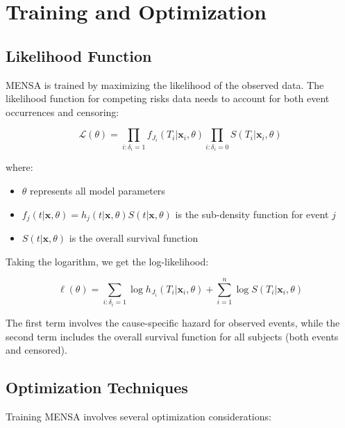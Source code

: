 \section{Training and Optimization}

\subsection{Likelihood Function}

MENSA is trained by maximizing the likelihood of the observed data. The likelihood function for competing risks data needs to account for both event occurrences and censoring:

\begin{equationbox}[title=MENSA Likelihood Function]
\begin{equation}
\mathcal{L}(\theta) = \prod_{i: \delta_i=1} f_{J_i}(T_i|\mathbf{x}_i, \theta) \prod_{i: \delta_i=0} S(T_i|\mathbf{x}_i, \theta)
\end{equation}

where:
\begin{itemize}
    \item $\theta$ represents all model parameters
    \item $f_j(t|\mathbf{x}, \theta) = h_j(t|\mathbf{x}, \theta) S(t|\mathbf{x}, \theta)$ is the sub-density function for event $j$
    \item $S(t|\mathbf{x}, \theta)$ is the overall survival function
\end{itemize}
\end{equationbox}

Taking the logarithm, we get the log-likelihood:

\begin{equation}
\ell(\theta) = \sum_{i: \delta_i=1} \log h_{J_i}(T_i|\mathbf{x}_i, \theta) + \sum_{i=1}^{n} \log S(T_i|\mathbf{x}_i, \theta)
\end{equation}

The first term involves the cause-specific hazard for observed events, while the second term includes the overall survival function for all subjects (both events and censored).

\subsection{Optimization Techniques}

Training MENSA involves several optimization considerations:

